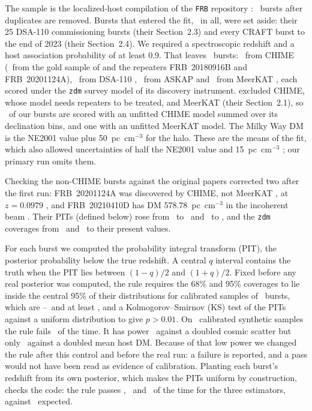 \documentclass[twocolumn]{aastex631}
\newcommand{\code}[1]{\texttt{#1}}
\begin{document}
The sample is the localized-host compilation of the \code{FRB} repository \citep{frbrepo}:
\dmzRealNLocal\ bursts after duplicates are removed. Bursts that entered the
\citet{hoffmann2025} fit, \dmzRealNProd\ in all, were set aside: their 25 DSA-110 commissioning
bursts (their Section~2.3) and every CRAFT burst to the end of 2023 (their Section~2.4). We
required a spectroscopic redshift and a host association probability of at least 0.9. That
leaves \dmzRealNCert\ bursts: \dmzRealNChime\ from CHIME (\dmzRealGoldN\ from the gold sample of
\citealt{leung2025} and the repeaters FRB~20180916B and FRB~20201124A), \dmzRealNDsa\ from
DSA-110 \citep{sharma2024}, \dmzRealNAskap\ from ASKAP \citep{shannon2025} and \dmzRealNMeer\
from MeerKAT \citep{caleb2023}, each scored under the \code{zdm} survey model of its discovery
instrument. \citet{hoffmann2025} excluded CHIME, whose model needs repeaters to be
treated, and MeerKAT (their Section~2.1), so \dmzRealNChime\ of our bursts are scored with an
unfitted CHIME model summed over its declination bins, and one with an unfitted MeerKAT model.
The Milky Way DM is the NE2001 value \citep{cordes2002} plus 50~pc~cm$^{-3}$ for the halo. These
are the means of the fit, which also allowed uncertainties of half the NE2001 value and
15~pc~cm$^{-3}$ \citep[][Section~3.1]{hoffmann2025}; our primary run omits them.

Checking the non-CHIME bursts against the original papers corrected two after the first run:
FRB~20201124A was discovered by CHIME, not MeerKAT \citep{lanman2022}, at $z=0.0979$
\citep{fong2021}, and FRB~20210410D has DM 578.78~pc~cm$^{-3}$ in the incoherent beam
\citep{caleb2023}. Their PITs (defined below) rose from \dmzRealFirstPitTwoOneOneTwoFour\ to
\dmzRealNowPitTwoOneOneTwoFour\ and \dmzRealFirstPitTwoOneZeroFourOneZero\ to
\dmzRealNowPitTwoOneZeroFourOneZero, and the \code{zdm} coverages from
\dmzRealFirstCovSixtyEight\ and \dmzRealFirstCovNinetyFive\ to their present values.

For each burst we computed the probability integral transform (PIT), the posterior probability
below the true redshift. A central $q$ interval contains the truth when the PIT lies between
$(1-q)/2$ and $(1+q)/2$. Fixed before any real posterior was computed, the
rule requires the 68\% and 95\% coverages to lie inside the central 95\% of their distributions for calibrated
samples of \dmzSynN\ bursts, which are \dmzSynBandLoSixtyEight--\dmzSynBandHiSixtyEight\ and at
least \dmzSynBandLoNinetyFive, and a Kolmogorov--Smirnov (KS) test of the PITs against a uniform
distribution to give $p>0.01$. On \dmzSynM\ calibrated synthetic samples the rule fails
\dmzSynFalseFail\ of the time. It has power \dmzSynPowerF\ against a doubled cosmic scatter but
only \dmzSynPowerHost\ against a doubled mean host DM. Because of that low power we changed the
rule after this control and before the real run: a failure is reported, and a pass would not
have been read as evidence of calibration. Planting each burst's redshift from its own posterior,
which makes the PITs uniform by construction, checks the code: the rule passes
\dmzRealPlantOne, \dmzRealPlantTwo\ and \dmzRealPlantThree\ of the time for the three
estimators, against \dmzSynPlantExpected\ expected.
\end{document}
